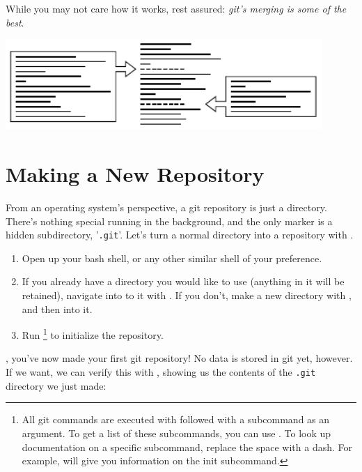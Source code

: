 \documentclass[11pt,letterpaper,twoside]{report}
\begin{document}
While you may not care how it works, rest assured: \emph{git's merging is some
of the best}.

\vspace{\fill}
\begin{center}
\includegraphics[width=12cm]{resources/patches_abstract.pdf}
\end{center}
\vspace*{\fill}

\chapter{Making a New Repository}

From an operating system's perspective, a git repository is just a directory.
There's nothing special running in the background, and the only marker is a
hidden subdirectory, '\texttt{.git}'. Let's turn a normal directory into a
repository with .

\begin{enumerate}
\item Open up your bash shell, or any other similar shell of your preference.
\item If you already have a directory you would like to use (anything in it will
    be retained), navigate into to it with . If you don't, make a new
    directory with , and then  into it.
\item Run \footnote{All git commands are executed with
     followed with a subcommand as an argument. To get a list of
    these subcommands, you can use . To look up documentation on
    a specific subcommand, replace the space with a dash. For example,
     will give you information on the init subcommand.} to
    initialize the repository.
\end{enumerate}

, you've now made your first git repository! No data is
stored in git yet, however. If we want, we can verify this with
, showing us the contents of the \texttt{.git} directory we just
made:
\end{document}
